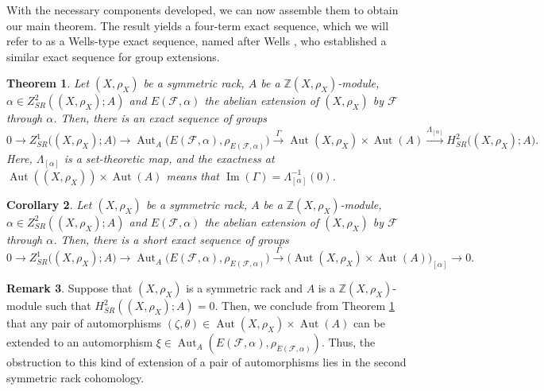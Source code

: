 \documentclass[11pt,reqno]{amsart}
\newtheorem{theorem}{Theorem}[section]
\newtheorem{corollary}[theorem]{Corollary}
\theoremstyle{definition}
\newtheorem{remark}[theorem]{Remark}
\numberwithin{equation}{subsection}
\begin{document}
With the necessary components developed, we can now assemble them to obtain our main theorem. The result yields a four-term exact sequence, which we will refer to as a Wells-type exact sequence, named after Wells \cite{CharlesWells71}, who established a similar exact sequence for group extensions.

\begin{theorem} \label{MainTheoremWells}
Let $(X, \rho_{X})$ be a symmetric rack, $A$ be a $\mathbb{Z}(X, \rho_{X})$-module, $\alpha \in Z_{S R}^{2}((X, \rho_{X}) ; A)$ and $E(\mathcal{F}, \alpha)$ the abelian extension of $(X, \rho_{X})$ by $\mathcal{F}$ through $\alpha$. Then, there is an exact sequence of groups
$$ 0\to Z_{SR}^{1} \big((X, \rho_{X});A \big)\to \operatorname{Aut}_{A} \big(E(\mathcal{F}, \alpha), \rho_{E(\mathcal{F}, \alpha)} \big) \stackrel{\Gamma}{\to}  \operatorname{Aut} (X, \rho_{X})\times\operatorname{Aut}(A) \stackrel{\Lambda_{[\alpha]}}{\to}  H_{SR}^{2} \big((X,\rho_{X});A \big). 
	$$
Here, $\Lambda_{[\alpha]}$ is a set-theoretic map, and the exactness at $\operatorname{Aut}((X, \rho_{X}))\times\operatorname{Aut}(A)$ means that $\operatorname{Im}(\Gamma)=\Lambda_{[\alpha]}^{-1}(0)$.
\end{theorem}

\begin{corollary}
Let $(X, \rho_{X})$ be a symmetric rack, $A$ be a $\mathbb{Z}(X, \rho_{X})$-module, $\alpha \in Z_{S R}^{2}((X, \rho_{X}) ; A)$ and $E(\mathcal{F}, \alpha)$ the abelian extension of $(X, \rho_{X})$ by $\mathcal{F}$ through $\alpha$. Then, there is a short exact sequence of groups
	$$
	0\to Z_{SR}^{1}\big((X, \rho_{X});A \big)\to \operatorname{Aut}_{A} \big(E(\mathcal{F}, \alpha), \rho_{E(\mathcal{F}, \alpha)}\big) \stackrel{\Gamma}{\to}  \big(\operatorname{Aut}(X, \rho_{X}) \times\operatorname{Aut}(A) \big)_{[\alpha]} \to 0.
	$$
\end{corollary}	
	
\begin{remark}\label{obstruction remark}
Suppose that $(X, \rho_{X})$ is a symmetric rack and $A$ is a $\mathbb{Z}(X, \rho_{X})$-module such that $H_{SR}^{2}((X,\rho_{X});A)=0$. Then, we conclude from Theorem \ref{MainTheoremWells} that any pair of automorphisms $(\zeta,\theta)  \in \operatorname{Aut}(X, \rho_{X}) \times\operatorname{Aut}(A)$ can be extended to an automorphism $\xi  \in \operatorname{Aut}_{A}(E(\mathcal{F}, \alpha), \rho_{E(\mathcal{F}, \alpha)})$. Thus, the obstruction to this kind of extension of a pair of automorphisms lies in the second symmetric rack cohomology.
\end{remark}
\end{document}
